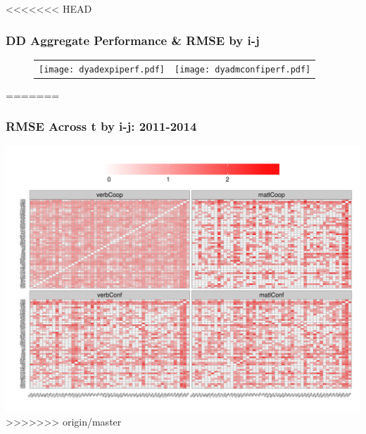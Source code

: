 \documentclass[10pt, compress]{beamer}
\begin{document}
\frame
{
<<<<<<< HEAD
\frametitle{DD Aggregate Performance \& RMSE by i-j}
  
  \begin{figure}[ht]
  \centering
    \begin{tabular}{cc}
      \hspace*{-.63in}
      \texttt{[image: dyadexpiperf.pdf]} & 
      \texttt{[image: dyadmconfiperf.pdf]}
    \end{tabular}
  \end{figure}
=======
\frametitle{RMSE Across t by i-j: 2011-2014}
  \centering
  \vspace*{-.3in}
  \includegraphics[width=1\textwidth]{2011-2014_iperf.pdf}
>>>>>>> origin/master
}
\end{document}
